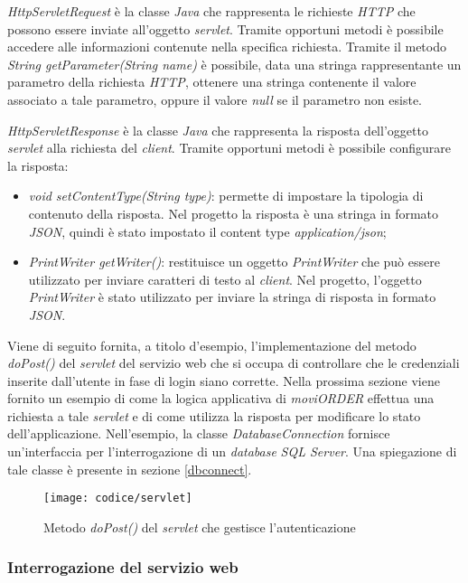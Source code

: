 \textit{HttpServletRequest} è la classe \textit{Java} che rappresenta le richieste \textit{HTTP} che possono essere inviate all'oggetto \textit{servlet}. Tramite opportuni metodi è possibile accedere alle informazioni contenute nella specifica richiesta. Tramite il metodo \textit{String getParameter(String name)} è possibile, data una stringa rappresentante un parametro della richiesta \textit{HTTP}, ottenere una stringa contenente il valore associato a tale parametro, oppure il valore \textit{null} se il parametro non esiste.

\textit{HttpServletResponse} è la classe \textit{Java} che rappresenta la risposta dell'oggetto \textit{servlet} alla richiesta del \textit{client}. Tramite opportuni metodi è possibile configurare la risposta:
\begin{itemize}
	\item \textit{void setContentType(String type)}: permette di impostare la tipologia di contenuto della risposta. Nel progetto la risposta è una stringa in formato \textit{JSON}, quindi è stato impostato il content type \textit{application/json};
	\item \textit{PrintWriter getWriter()}: restituisce un oggetto \textit{PrintWriter} che può essere utilizzato per inviare caratteri di testo al \textit{client}. Nel progetto, l'oggetto \textit{PrintWriter} è stato utilizzato per inviare la stringa di risposta in formato \textit{JSON}.
\end{itemize}

Viene di seguito fornita, a titolo d'esempio, l'implementazione del metodo \textit{doPost()} del \textit{servlet} del servizio web che si occupa di controllare che le credenziali inserite dall'utente in fase di login siano corrette. Nella prossima sezione viene fornito un esempio di come la logica applicativa di \textit{moviORDER} effettua una richiesta a tale \textit{servlet} e di come utilizza la risposta per modificare lo stato dell'applicazione. Nell'esempio, la classe \textit{DatabaseConnection} fornisce un'interfaccia per l'interrogazione di un \textit{database} \textit{SQL Server}. Una spiegazione di tale classe è presente in sezione \ref{dbconnect}.

\begin{figure}[!h] 
    \centering 
    \texttt{[image: codice/servlet]} 
    \caption{Metodo \textit{doPost()} del \textit{servlet} che gestisce l'autenticazione}
\end{figure}

\subsubsection{Interrogazione del servizio web}

